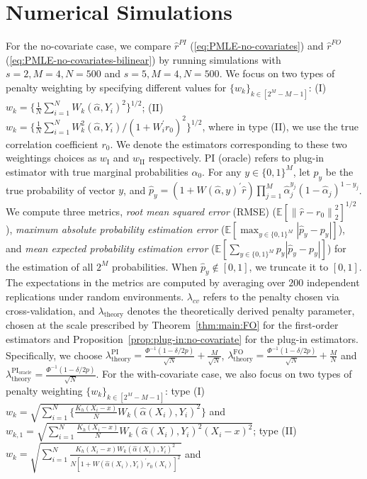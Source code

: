 \documentclass[11pt]{article}
\newcommand{\norm}[1]{\left\lVert #1 \right\rVert}
\begin{document}
\section{Numerical Simulations}\label{sec:simulations}
For the no-covariate case, we compare $\hat{r}^{PI}$ (\ref{eq:PMLE-no-covariates}) and $\hat{r}^{FO}$ (\ref{eq:PMLE-no-covariates-bilinear}) by running simulations with $s=2,M=4,N=500$ and $s=5, M=4, N=500$. We focus on two types of penalty weighting by specifying different values for $\{w_k\}_{k\in[2^M-M-1]}$: (I) $w_{k}=\{\frac{1}{N}\sum_{i=1}^NW_{k}(\hat{\alpha},Y_i)^2\}^{1/2}$; (II) $w_{k}=\{\frac{1}{N}\sum_{i=1}^N W_{k}^2(\hat{\alpha},Y_i)/(1+W_i^\prime r_0)^2\}^{1/2}$, where in type (\textrm{II}), we use the true correlation coefficient $r_0$. We denote the estimators corresponding to these two weightings choices as $w_{\textrm{I}}$ and $w_{\textrm{II}}$ respectively. PI (oracle) refers to plug-in estimator with true marginal probabilities $\alpha_0$. For any $y\in\{0,1\}^M$, let $p_y$ be the true probability of vector $y$, and $\hat{p}_y=
(1+W(\hat{\alpha},y)^\prime \hat{r})\prod_{j=1}^M\hat{\alpha}_j^{y_j}(1-\hat{\alpha}_j)^{1-y_j}$. We compute three metrics, \textit{root mean squared error} (RMSE) ($\mathbb{E}[\norm{\hat{r}-r_0}_2^2]^{1/2}$), \textit{maximum absolute probability estimation error} ($\mathbb{E}[\max_{y\in\{0,1\}^M}|\hat{p}_y-p_y|]$), and \textit{mean expected probability estimation error} ($\mathbb{E}[\sum_{y\in\{0,1\}^M}p_y|\hat{p}_y-p_y|]$) for the estimation of all $2^M$ probabilities. When $\hat{p}_y \notin [0,1]$, we truncate it to $[0,1]$. The expectations in the metrics are computed by averaging over $200$ independent replications under random environments. $\lambda_{cv}$ refers to the penalty chosen via cross-validation, and $\lambda_{\mathrm{theory}}$ denotes the theoretically derived penalty parameter, chosen at the scale prescribed by Theorem~\ref{thm:main:FO} for the first-order estimators and Proposition~\ref{prop:plug-in:no-covariate} for the plug-in estimators. Specifically, we choose 
$\lambda_{\mathrm{theory}}^{\mathrm{PI}}=\frac{\Phi^{-1}(1-\delta/2p)}{\sqrt{N}}+\frac{M}{\sqrt{N}}$, $\lambda_{\mathrm{theory}}^{\mathrm{FO}}=\frac{\Phi^{-1}(1-\delta/2p)}{\sqrt{N}}+\frac{M}{N}$ and $\lambda_{\mathrm{theory}}^{\mathrm{PI}_{\mathrm{oracle}}}=\frac{\Phi^{-1}(1-\delta/2p)}{\sqrt{N}}$. For the with-covariate case, we also focus on two types of penalty weighting $\{w_k\}_{k \in [2^M - M - 1]}$: type (I) $w_{k}=\sqrt{\sum_{i=1}^N\{\frac{K_h(X_i-x)}{N}W_{k}(\hat{\alpha}(X_i),Y_i)^2}\}$ and $w_{k,1}=\sqrt{\sum_{i=1}^N\frac{K_h(X_i-x)}{N}W_{k}(\hat{\alpha}(X_i),Y_i)^2(X_{i}-x)^2}$; type (II) $w_{k}=\sqrt{\sum_{i=1}^N\frac{K_h(X_i-x)W_{k}(\hat{\alpha}(X_i),Y_i)^2}{N[1+W(\hat{\alpha}(X_i),Y_i)^\prime r_0(X_i)]^2}}$ and 
\end{document}
